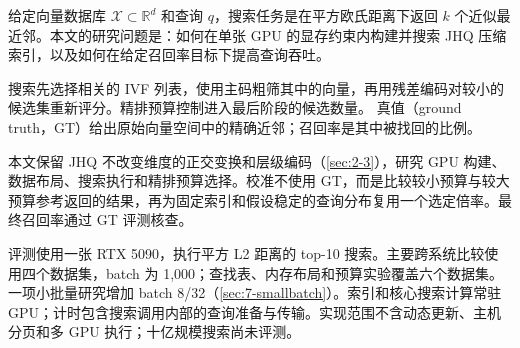 给定向量数据库 $\mathcal X\subset\mathbb R^d$ 和查询 $q$，搜索任务是在平方欧氏距离下返回 $k$ 个近似最近邻。本文的研究问题是：如何在单张 GPU 的显存约束内构建并搜索 JHQ 压缩索引，以及如何在给定召回率目标下提高查询吞吐。

搜索先选择相关的 IVF 列表，使用主码粗筛其中的向量，再用残差编码对较小的候选集重新评分。精排预算控制进入最后阶段的候选数量。
真值（ground truth，GT）给出原始向量空间中的精确近邻；召回率是其中被找回的比例。

本文保留 JHQ 不改变维度的正交变换和层级编码（\cref{sec:2-3}），研究 GPU 构建、数据布局、搜索执行和精排预算选择。校准不使用 GT，而是比较较小预算与较大预算参考返回的结果，再为固定索引和假设稳定的查询分布复用一个选定倍率。最终召回率通过 GT 评测核查。

评测使用一张 RTX 5090，执行平方 L2 距离的 top-10 搜索。主要跨系统比较使用四个数据集，batch 为 1,000；查找表、内存布局和预算实验覆盖六个数据集。一项小批量研究增加 batch 8/32（\cref{sec:7-smallbatch}）。索引和核心搜索计算常驻 GPU；计时包含搜索调用内部的查询准备与传输。实现范围不含动态更新、主机分页和多 GPU 执行；十亿规模搜索尚未评测。

